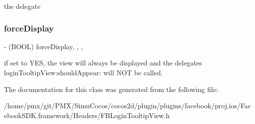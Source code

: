 the delegate \mbox{\label{interfaceFBLoginTooltipView_a98970e89f2bb1476b33ee20a0d525ea0}} 
\subsubsection{\texorpdfstring{force\+Display}{forceDisplay}}
{\footnotesize\ttfamily -\/ (B\+O\+OL) force\+Display\hspace{0.3cm}{\ttfamily [read]}, {\ttfamily [write]}, {\ttfamily [nonatomic]}, {\ttfamily [assign]}}

if set to Y\+ES, the view will always be displayed and the delegate\textquotesingle{}s {\ttfamily login\+Tooltip\+View\+:should\+Appear\+:} will N\+OT be called. 

The documentation for this class was generated from the following file\+:\begin{DoxyCompactItemize}
\item 
/home/pmx/git/\+P\+M\+X/\+Simu\+Cocos/cocos2d/plugin/plugins/facebook/proj.\+ios/\+Facebook\+S\+D\+K.\+framework/\+Headers/F\+B\+Login\+Tooltip\+View.\+h\end{DoxyCompactItemize}
